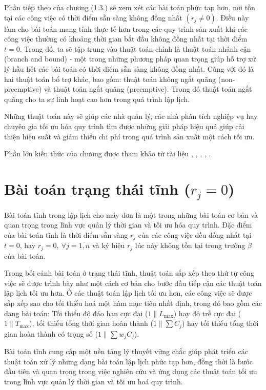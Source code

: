 \documentclass[12pt,a4paper]{report}
\begin{document}
Phần tiếp theo của chương (1.3.) sẽ xem xét các bài toán phức tạp hơn, nơi tồn tại các công việc có thời điểm sẵn sàng không đồng nhất $(r_j \neq 0)$. Điều này làm cho bài toán mang tính thực tế hơn trong các quy trình sản xuất khi các công việc thường có khoảng thời gian bắt đầu không đồng nhất tại thời điểm $t=0$. Trong đó, ta sẽ tập trung vào thuật toán chính là thuật toán nhánh cận (branch and bound) - một trong những phương pháp quan trọng giúp hỗ trợ xử lý hầu hết các bài toán có thời điểm sẵn sàng không đồng nhất. Cùng với đó là hai thuật toán bổ trợ khác, bao gồm: thuật toán không ngắt quãng (non-preemptive) và thuật toán ngắt quãng (preemptive). Trong đó thuật toán ngắt quãng cho ta sự linh hoạt cao hơn trong quá trình lập lịch.

Những thuật toán này sẽ giúp các nhà quản lý, các nhà phân tích nghiệp vụ hay chuyên gia tối ưu hóa quy trình tìm được những giải pháp hiệu quả giúp cải thiện hiệu suất và giảm thiểu chi phí trong quá trình sản xuất một cách tối ưu.

Phần lớn kiến thức của chương được tham khảo từ tài liệu \cite{minhhuy}, \cite{inbook}, \cite{pinedo2009planning}, \cite{PMBOK2013}, \cite{PostekZoccaAMPL2024}.

\section{Bài toán trạng thái tĩnh ($r_j = 0$)}\label{1.2.}
Bài toán tĩnh trong lập lịch cho máy đơn là một trong những bài toán cơ bản và quan trọng trong lĩnh vực quản lý thời gian và tối ưu hóa quy trình. Đặc điểm của bài toán tĩnh là thời điểm sẵn sàng $r_j$ của các công việc đều đồng nhất tại $t=0$, hay $r_j = 0, \: \forall j=\overline{1,n}$ và ký hiệu $r_j$ lúc này không tồn tại trong trường $\beta$ của bài toán.

Trong bối cảnh bài toán ở trạng thái tĩnh, thuật toán sắp xếp theo thứ tự công việc sẽ được trình bày như một cách cơ bản cho bước đầu tiếp cận các thuật toán lập lịch tối ưu hơn. Ở các thuật toán lập lịch tối ưu hơn, các công việc sẽ được sắp xếp sao cho tối thiểu hoá một hàm mục tiêu nhất định, trong đó bao gồm các dạng bài toán: Tối thiểu độ đáo hạn cực đại ($1\|L_{\max}$) hay độ trễ cực đại ($1\|T_{\max}$), tối thiểu tổng thời gian hoàn thành ($1\|\sum C_j$) hay tối thiểu tổng thời gian hoàn thành có trọng số ($1\|\sum w_j C_j$).

Bài toán tĩnh cung cấp một nền tảng lý thuyết vững chắc giúp phát triển các thuật toán xử lý những dạng bài toán lập lịch phức tạp hơn, đồng thời là bước đầu tiên và quan trọng trong việc nghiên cứu và ứng dụng các thuật toán tối ưu trong lĩnh vực quản lý thời gian và tối ưu hoá quy trình.
\end{document}
